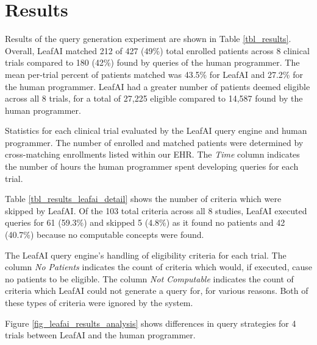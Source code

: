 \documentclass[../main.tex]{subfiles}
\begin{document}
\section{Results}

Results of the query generation experiment are shown in Table \ref{tbl_results}. Overall, LeafAI matched 212 of 427 (49\%) total enrolled patients across 8 clinical trials compared to 180 (42\%) found by queries of the human programmer. The mean per-trial percent of patients matched was 43.5\% for LeafAI and 27.2\% for the human programmer. LeafAI had a greater number of patients deemed eligible across all 8 trials, for a total of 27,225 eligible compared to 14,587 found by the human programmer. 

\begin{table}[h!]
    \small
    \centering
    
    \caption{Statistics for each clinical trial evaluated by the LeafAI query engine and human programmer. The number of enrolled and matched patients were determined by cross-matching enrollments listed within our EHR. The \textit{Time} column indicates the number of hours the human programmer spent developing queries for each trial.}
    \label{tbl_results}
\end{table} 

Table \ref{tbl_results_leafai_detail} shows the number of criteria which were skipped by LeafAI. Of the 103 total criteria across all 8 studies, LeafAI executed queries for 61 (59.3\%) and skipped 5 (4.8\%) as it found no patients and 42 (40.7\%) because no computable concepts were found. 

\begin{table}[h!]
    \footnotesize
    \centering
    
    \caption{The LeafAI query engine's handling of eligibility criteria for each trial. The column \textit{No Patients} indicates the count of criteria which would, if executed, cause no patients to be eligible. The column \textit{Not Computable} indicates the count of criteria which LeafAI could not generate a query for, for various reasons. Both of these types of criteria were ignored by the system.}
    \label{tbl_results_leafai_detail}
\end{table} 

Figure \ref{fig_leafai_results_analysis} shows differences in query strategies for 4 trials between LeafAI and the human programmer. 
\end{document}
